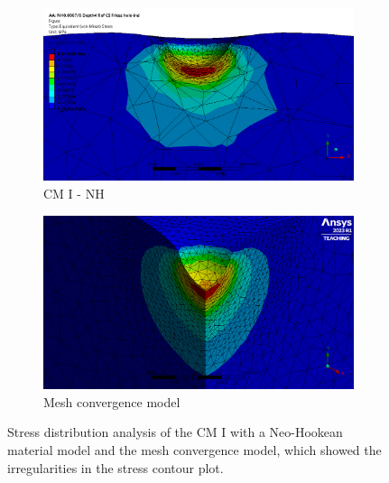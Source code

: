\begin{figure}
    \centering
    \begin{subfigure}[b]{0.8\textwidth}
    \centering
    \includegraphics[width=\textwidth]{Images/computational/37CSNHstresshalfzoommesh.png}
    \caption{CM I - NH}
    \label{fig:cm1meshtotal}
    \end{subfigure}
    \vspace{0.3cm}
    \begin{subfigure}[b]{0.8\textwidth}
    \centering
    \includegraphics[width=\textwidth]{Images/computational/meshzoomstress.png}
    \caption{Mesh convergence model}
    \label{fig:cm1meshref}
    \end{subfigure}
    \hspace{0.3cm}
    \caption[Mesh convergence model I stress distribution]{Stress distribution analysis of the CM I with a Neo-Hookean material model and the mesh convergence model, which showed the irregularities in the stress contour plot.}
    \label{fig:stressdistributionanalysis}
\end{figure}
